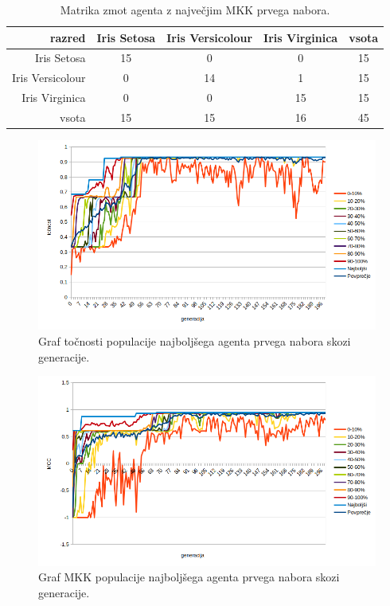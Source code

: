 \begin{table}[H]
    \centering
    \begin{tabular}{||rcccc||}
        \hline
        razred           & Iris Setosa & Iris Versicolour & Iris Virginica & vsota \\ \hline
        Iris Setosa      & 15          & 0                & 0              & 15    \\ \hline
        Iris Versicolour & 0           & 14               & 1              & 15    \\ \hline
        Iris Virginica   & 0           & 0                & 15             & 15    \\ \hline
        vsota            & 15          & 15               & 16             & 45    \\ \hline
    \end{tabular}
    \caption{Matrika zmot agenta z največjim MKK prvega nabora.}
    \label{tab:iris_mcc_1}
\end{table}

\begin{figure}[H]
    \begin{center}
        \includegraphics[width=13cm]{iris/1/acc}
    \end{center}
    \caption{Graf točnosti populacije najboljšega agenta prvega nabora skozi generacije.}
    \label{fig:iris_acc_1}
\end{figure}

\begin{figure}[H]
    \begin{center}
        \includegraphics[width=13cm]{iris/1/mcc}
    \end{center}
    \caption{Graf MKK populacije najboljšega agenta prvega nabora skozi generacije.}
    \label{fig:iris_mcc_1}
\end{figure}

